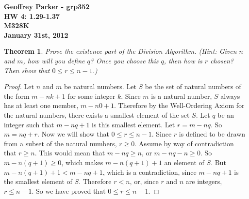 \documentclass[12pt,leqno]{article}
\numberwithin{equation}{section}
\newtheorem{thm}{Theorem}[section]
\theoremstyle{definition}
\begin{document}
\thispagestyle{plain}
\begin{flushright}
\large{\textbf{Geoffrey Parker - grp352 \\
HW 4: 1.29-1.37\\
M328K \\
January 31st, 2012 \\}}
\end{flushright}

\markboth{}{} \setcounter{section}{0} \baselineskip=18pt

\setcounter{tocdepth}{4}



\setcounter{section}{1}

\setcounter{thm}{25}

\begin{thm}
Prove the existence part of the Division Algorithm. (\textit{Hint}:
Given $n$ and $m$, how will you define $q$?  Once you choose this
$q$, then how is $r$ chosen?  Then show that $0 \leq r \leq n-1$.)
\end{thm}

\begin{proof}[Proof]
Let $n$ and $m$ be natural numbers.  Let $S$ be the set of natural numbers of the form $m-nk + 1$ for some integer $k$.  Since $m$ is a natural number, $S$ always has at least one member, $m-n0 + 1$.  Therefore by the Well-Ordering Axiom for the natural numbers, there exists a smallest element of the set $S$.  Let $q$ be an integer such that $m-nq + 1$ is this smallest element.  Let $r = m - nq$.  So $m = nq + r$.  Now we will show that $0 \leq r \leq n-1$.  Since $r$ is defined to be drawn from a  subset of the natural numbers, $r \geq 0$.  Assume by way of contradiction that $r \geq n$.  This would mean that $m - nq \geq n$, or $m - nq - n \geq 0$.  So $m - n(q+1) \geq 0$, which makes $m - n(q+1) + 1$ an element of $S$.  But $m - n(q+1) + 1 < m - nq + 1$, which is a contradiction, since $m - nq + 1$ is the smallest element of $S$.  Therefore $r < n$, or, since $r$ and $n$ are integers, $r \leq n-1$.  So we have proved that $0 \leq r \leq n-1$.
\end{proof}
\end{document}
